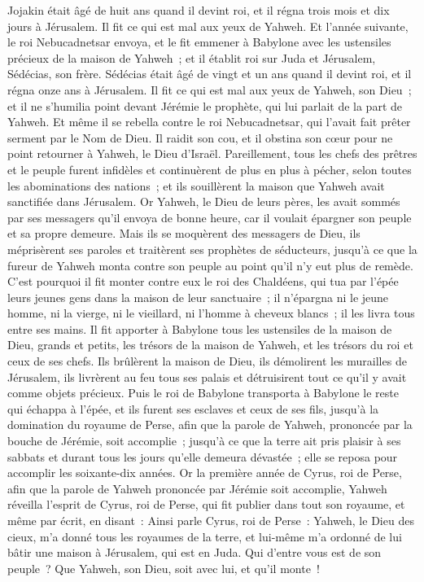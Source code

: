 \begin{multicols}{2}
Jojakin était âgé de huit ans quand il devint roi, et il régna trois mois et dix jours à Jérusalem. Il fit ce qui est mal aux yeux de Yahweh.
Et l'année suivante, le roi Nebucadnetsar envoya, et le fit emmener à Babylone avec les ustensiles précieux de la maison de Yahweh~; et il établit roi sur Juda et Jérusalem, Sédécias, son frère.
Sédécias était âgé de vingt et un ans quand il devint roi, et il régna onze ans à Jérusalem.
Il fit ce qui est mal aux yeux de Yahweh, son Dieu~; et il ne s'humilia point devant Jérémie le prophète, qui lui parlait de la part de Yahweh.
Et même il se rebella contre le roi Nebucadnetsar, qui l'avait fait prêter serment par le Nom de Dieu. Il raidit son cou, et il obstina son cœur pour ne point retourner à Yahweh, le Dieu d'Israël.
Pareillement, tous les chefs des prêtres et le peuple furent infidèles et continuèrent de plus en plus à pécher, selon toutes les abominations des nations~; et ils souillèrent la maison que Yahweh avait sanctifiée dans Jérusalem.
Or Yahweh, le Dieu de leurs pères, les avait sommés par ses messagers qu'il envoya de bonne heure, car il voulait épargner son peuple et sa propre demeure.
Mais ils se moquèrent des messagers de Dieu, ils méprisèrent ses paroles et traitèrent ses prophètes de séducteurs, jusqu'à ce que la fureur de Yahweh monta contre son peuple au point qu'il n'y eut plus de remède.
C'est pourquoi il fit monter contre eux le roi des Chaldéens, qui tua par l'épée leurs jeunes gens dans la maison de leur sanctuaire~; il n'épargna ni le jeune homme, ni la vierge, ni le vieillard, ni l'homme à cheveux blancs~; il les livra tous entre ses mains.
Il fit apporter à Babylone tous les ustensiles de la maison de Dieu, grands et petits, les trésors de la maison de Yahweh, et les trésors du roi et ceux de ses chefs.
Ils brûlèrent la maison de Dieu, ils démolirent les murailles de Jérusalem, ils livrèrent au feu tous ses palais et détruisirent tout ce qu'il y avait comme objets précieux.
Puis le roi de Babylone transporta à Babylone le reste qui échappa à l'épée, et ils furent ses esclaves et ceux de ses fils, jusqu'à la domination du royaume de Perse,
afin que la parole de Yahweh, prononcée par la bouche de Jérémie, soit accomplie~; jusqu'à ce que la terre ait pris plaisir à ses sabbats et durant tous les jours qu'elle demeura dévastée~; elle se reposa pour accomplir les soixante-dix années.
Or la première année de Cyrus, roi de Perse, afin que la parole de Yahweh prononcée par Jérémie soit accomplie, Yahweh réveilla l'esprit de Cyrus, roi de Perse, qui fit publier dans tout son royaume, et même par écrit, en disant~:
Ainsi parle Cyrus, roi de Perse~: Yahweh, le Dieu des cieux, m'a donné tous les royaumes de la terre, et lui-même m'a ordonné de lui bâtir une maison à Jérusalem, qui est en Juda. Qui d'entre vous est de son peuple~? Que Yahweh, son Dieu, soit avec lui, et qu'il monte~!
\PPE{}
\end{multicols}

